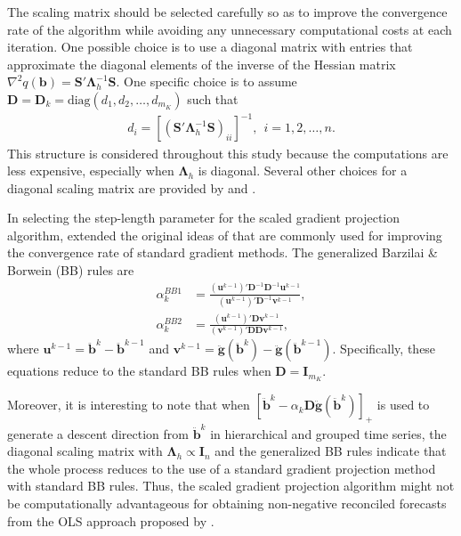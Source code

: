 \documentclass[11pt]{article}
\newcommand{\0}{\phantom{0}}
\begin{document}
The scaling matrix should be selected carefully so as to improve the convergence rate of the algorithm while avoiding any unnecessary computational costs at each iteration. One possible choice is to use a diagonal matrix with entries that approximate the diagonal elements of the inverse of the Hessian matrix $\nabla^{2}q(\bm{b}) = \bm{S}'\bm{\Lambda}_{h}^{-1}\bm{S}$. One specific choice is to assume $\bm{D} = \bm{D}_{k} = \text{diag}(d_{1}, d_{2}, \dots, d_{m_{K}})$ such that
\begin{align*}
d_{i} = \left[\left(\bm{S}'\bm{\Lambda}_{h}^{-1}\bm{S}\right)_{ii}\right]^{-1}, \ \ i = 1, 2, \dots, n.
\end{align*}
This structure is considered throughout this study because the computations are less expensive, especially when $\bm{\Lambda}_{h}$ is diagonal. Several other choices for a diagonal scaling matrix are provided by \citet{Bonettini2009} and \citet{Bertero2013}. 

In selecting the step-length parameter for the scaled gradient projection algorithm, \citet{Bonettini2009} extended the original ideas of \citet{Barzilai1988} that are commonly used for improving the convergence rate of standard gradient methods. The generalized Barzilai \& Borwein (BB) rules are
\begin{align*}
\alpha_{k}^{BB1} & = \frac{(\bm{u}^{k-1})'\bm{D}^{-1} \bm{D}^{-1} \bm{u}^{k-1}}{(\bm{u}^{k-1})'\bm{D}^{-1}\bm{v}^{k-1}},\\
\alpha_{k}^{BB2} & = \frac{(\bm{u}^{k-1})'\bm{D}\bm{v}^{k-1}}{(\bm{v}^{k-1})'\bm{D}\bm{D}\bm{v}^{k-1}},
\end{align*}
where $\bm{u}^{k-1} = \ddot{\bm{b}}^{k} - \ddot{\bm{b}}^{k-1}$ and $\bm{v}^{k-1} = \ddot{\bm{g}}(\ddot{\bm{b}}^{k}) - \ddot{\bm{g}}(\ddot{\bm{b}}^{k-1})$. Specifically, these equations reduce to the standard BB rules when $\bm{D} = \bm{I}_{m_{K}}$.

Moreover, it is interesting to note that when $[\ddot{\bm{b}}^{k} - \alpha_{k} \bm{D} \ddot{\bm{g}}(\ddot{\bm{b}}^{k})]_{+}$ is used to generate a descent direction from $\ddot{\bm{b}}^{k}$ in hierarchical and grouped time series, the diagonal scaling matrix with $\bm{\Lambda}_{h} \propto \bm{I}_{n}$ and the generalized BB rules indicate that the whole process reduces to the use of a standard gradient projection method with standard BB rules. Thus, the scaled gradient projection algorithm might not be computationally advantageous for obtaining non-negative reconciled forecasts from the OLS approach proposed by \citet{Hyndman2011}. 
\end{document}
